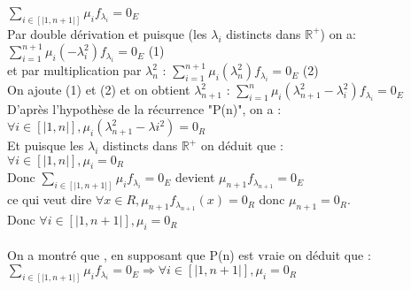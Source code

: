 \documentclass{book}
\begin{document}
\begin{itemize}
\(\sum_{i \in [|1,n+1|]}\mu_{i}f_{\lambda_{i}}=0_{E}\)
\\ Par double dérivation et puisque (les \(\lambda_{i}\) distincts dans \(\mathbb{R}^+\)) on a: \\ \(\sum_{i=1}^{n+1}\mu_{i}(-\lambda_{i}^2)f_{\lambda_{i}}=0_{E}\) (1)
\\ et par multiplication par \(\lambda_{n}^2\) : \(\sum_{i=1}^{n+1}\mu_{i}(\lambda_{n}^2)f_{\lambda_{i}}=0_{E}\) (2)
\\ On ajoute (1) et (2) et on obtient \(\lambda_{n+1}^2\) : \(\sum_{i=1}^{n}\mu_{i}(\lambda_{n+1}^2-\lambda_{i}^2)f_{\lambda_{i}}=0_{E}\)
\\ D'après l'hypothèse de la récurrence "P(n)", on a : \\ \(\forall i \in [|1,n|], \mu_{i}(\lambda_{n+1}^2-\lambda{i}^2)=0_{R}\)
\\ Et puisque les \(\lambda_{i}\) distincts dans \(\mathbb{R}^+\) on déduit que : \\ \(\forall i\in [|1,n|], \mu_{i}=0_{R}\)
\\ Donc \(\sum_{i \in [|1,n+1|] } \mu_{i}f_{\lambda_{i}}=0_{E}\) devient \(\mu_{n+1}f_{\lambda_{n+1}}=0_{E}\)
\\ ce qui veut dire \(\forall x \in R,\mu_{n+1}f_{\lambda_{n+1}}(x)=0_{R} \) donc \(\mu_{n+1}=0_{R}\).
\\ Donc \( \forall i \in [|1,n+1|], \mu_{i}=0_{R}\)
\\ \\ On a montré que , en supposant que P(n) est vraie on déduit que : \(\sum_{i \in [|1,n+1|]}\mu_{i}f_{\lambda_{i}}=0_{E} \Rightarrow \forall i \in [|1,n+1|],\mu_{i}=0_{R}\)


\end{itemize}
\end{document}
